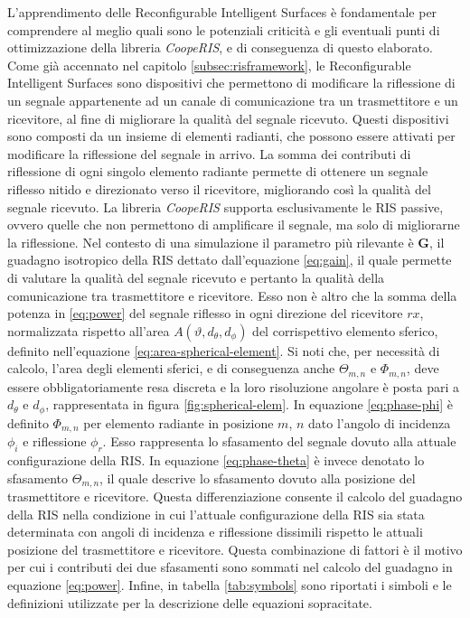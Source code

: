 L'apprendimento delle Reconfigurable Intelligent Surfaces è fondamentale per comprendere
al meglio quali sono le potenziali criticità e gli eventuali punti di ottimizzazione
della libreria \textit{CoopeRIS}, e di conseguenza di questo elaborato. Come già
accennato nel capitolo \ref{subsec:risframework}, le Reconfigurable Intelligent Surfaces
sono dispositivi che permettono di modificare la riflessione di un segnale appartenente
ad un canale di comunicazione tra un trasmettitore e un ricevitore, al fine di
migliorare la qualità del segnale ricevuto. Questi dispositivi sono composti da un
insieme di elementi radianti, che possono essere attivati per modificare la
riflessione del segnale in arrivo. La somma dei contributi di riflessione di ogni
singolo elemento radiante permette di ottenere un segnale riflesso nitido e direzionato
verso il ricevitore, migliorando così la qualità del segnale ricevuto. La libreria
\textit{CoopeRIS} supporta esclusivamente le RIS passive, ovvero quelle che non permettono
di amplificare il segnale, ma solo di migliorarne la riflessione. Nel contesto di
una simulazione il parametro più rilevante è $\textbf{G}$, il guadagno
isotropico della RIS dettato dall'equazione \ref{eq:gain}, il quale permette di valutare
la qualità del segnale ricevuto e pertanto la qualità della comunicazione tra trasmettitore
e ricevitore. Esso non è altro che la somma della potenza in \ref{eq:power} del
segnale riflesso in ogni direzione del ricevitore $rx$, normalizzata rispetto all'area
$A(\vartheta, d_{\theta}, d_{\phi})$ del corrispettivo elemento sferico,
definito nell'equazione \ref{eq:area-spherical-element}. Si noti che, per
necessità di calcolo, l'area degli elementi sferici, e di conseguenza anche
$\Theta_{m,n}$ e $\Phi_{m,n}$, deve essere obbligatoriamente resa discreta e la loro
risoluzione angolare è posta pari a $d_{\theta}$ e $d_{\phi}$, rappresentata in
figura \ref{fig:spherical-elem}. In equazione \ref{eq:phase-phi} è definito $\Phi
_{m,n}$ per elemento radiante in posizione $m$, $n$ dato l'angolo di incidenza
$\phi_{i}$ e riflessione $\phi_{r}$. Esso rappresenta lo sfasamento del segnale dovuto
alla attuale configurazione della RIS. In equazione \ref{eq:phase-theta} è
invece denotato lo sfasamento $\Theta_{m,n}$, il quale descrive lo sfasamento dovuto
alla posizione del trasmettitore e ricevitore. Questa differenziazione consente
il calcolo del guadagno della RIS nella condizione in cui l'attuale
configurazione della RIS sia stata determinata con angoli di incidenza e
riflessione dissimili rispetto le attuali posizione del trasmettitore e
ricevitore. Questa combinazione di fattori è il motivo per cui i contributi dei due
sfasamenti sono sommati nel calcolo del guadagno in equazione \ref{eq:power}.
Infine, in tabella \ref{tab:symbols} sono riportati i simboli e le definizioni utilizzate
per la descrizione delle equazioni sopracitate.


